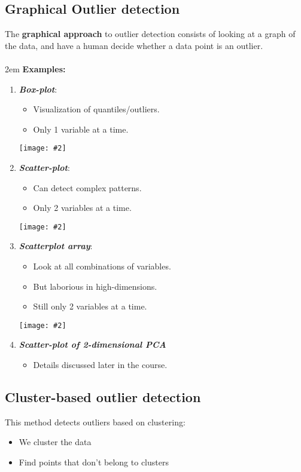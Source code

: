 \documentclass{article}
\def\blu#1{{\color{blu}#1}}
\def\gre#1{{\color{gre}#1}}
\def\red#1{{\color{red}#1}}
\theoremstyle{definition}
\newcommand{\centerfig}[2]{\begin{center}\texttt{[image: \#2]}\end{center}}
\begin{document}
\subsection*{Graphical Outlier detection}
The \gre{\textbf{graphical approach}} to outlier detection consists of looking at a graph of the data, and have a \gre{human decide} whether a data point is an outlier. \\ \\

\begingroup
\leftskip 2em
\noindent \textbf{Examples:}
\begin{enumerate}
	\item \textit{\textbf{Box-plot}}:
\begin{itemize}
	\item \blu{Visualization of quantiles/outliers}.
	\item \red{Only 1 variable at a time}.
\end{itemize}
\centerfig{0.6}{Pic17}
\item \textbf{\textit{Scatter-plot}}:
\begin{itemize}
	\item \blu{Can detect complex patterns}.
	\item \red{Only 2 variables at a time}.
\end{itemize}
\centerfig{0.6}{Pic18}
\item \textbf{\textit{Scatterplot array}}:
\begin{itemize}
	\item \blu{Look at all combinations of variables}. 
	\item But laborious in high-dimensions.
	\item \red{Still only 2 variables at a time}.
\end{itemize}
\centerfig{0.6}{Pic19}
\item \textbf{\textit{Scatter-plot of 2-dimensional PCA}}
\begin{itemize}
	\item Details discussed later in the course. 
\end{itemize}
\end{enumerate}

\endgroup

\subsection*{Cluster-based outlier detection}
This method detects outliers based on clustering:
\begin{itemize}
	\item We \gre{cluster the data}
	\item \gre{Find points that don’t belong to clusters}
\end{itemize}
\end{document}
